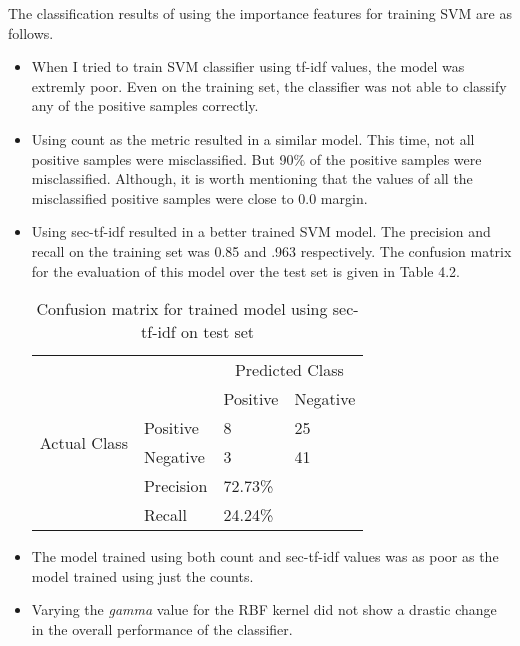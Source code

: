The classification results of using the importance features for training SVM are as follows.
\begin{itemize}
\item When I tried to train SVM classifier using tf-idf values, the model was extremly poor.
Even on the training set, the classifier was not able to classify any of the positive samples correctly.
\item Using count as the metric resulted in a similar model.
This time, not all positive samples were misclassified. But 90\% of the positive samples were misclassified.
Although, it is worth mentioning that the values of all the misclassified positive samples were close to 0.0 margin.
\item Using sec-tf-idf resulted in a better trained SVM model.
The precision and recall on the training set was 0.85 and .963 respectively.
The confusion matrix for the evaluation of this model over the test set is given in Table 4.2.
\begin{table}[h]
\centering
\caption{Confusion matrix for trained model using sec-tf-idf on test set}
\begin{tabular}{ll|l|l}
\cline{3-4}
                                                   &                                 & \multicolumn{2}{|c|}{Predicted Class}     \\ \cline{3-4} 
                                                   &                                 & Positive & \multicolumn{1}{|l|}{Negative} \\ \hline
\multicolumn{1}{|l}{\multirow{2}{*}{Actual Class}} & \multicolumn{1}{|l|}{Positive}  & 8        & \multicolumn{1}{|l|}{25}       \\ \cline{2-4} 
\multicolumn{1}{|l}{}                              & \multicolumn{1}{|l|}{Negative}  & 3        & \multicolumn{1}{|l|}{41}       \\ \hline
                                                   & \multicolumn{1}{|l|}{Precision} & 72.73\%  &                                \\ \cline{2-3}
                                                   & \multicolumn{1}{|l|}{Recall}    & 24.24\%  &                                \\ \cline{2-3}
\end{tabular}
\end{table}
\item The model trained using both count and sec-tf-idf values was as poor as the model trained using just the counts.
\item Varying the \textit{gamma} value for the RBF kernel did not show a drastic change in the overall performance of the classifier.

\end{itemize}
